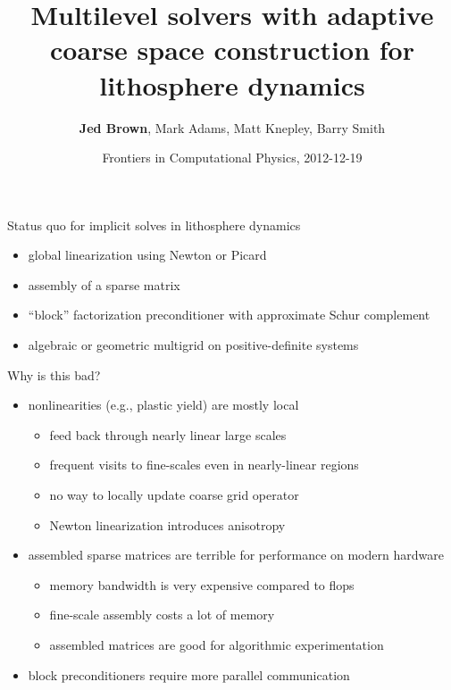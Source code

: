 \documentclass{beamer}
\title{Multilevel solvers with adaptive coarse space construction for lithosphere dynamics}
\author{{\bf Jed Brown}\inst{1}, Mark Adams\inst{2}, Matt Knepley\inst{3}, Barry Smith\inst{1}}
\institute
{
  \inst{1}{Mathematics and Computer Science Division, Argonne National Laboratory} \\
  \inst{2}{Columbia University} \\
  \inst{3}{University of Chicago} \\
}
\date{Frontiers in Computational Physics, 2012-12-19}
\begin{document}
\lstset{language=C}
\normalem

\begin{frame}
  \titlepage
\end{frame}


\begin{frame}{Status quo for implicit solves in lithosphere dynamics}
  \begin{itemize}
  \item global linearization using Newton or Picard
  \item assembly of a sparse matrix
  \item ``block'' factorization preconditioner with approximate Schur complement
  \item algebraic or geometric multigrid on positive-definite systems
  \end{itemize}
  \begin{block}{Why is this bad?}
    \vspace{-1em}
    \begin{itemize}
    \item nonlinearities (e.g., plastic yield) are mostly local
      \begin{itemize}
      \item feed back through nearly linear large scales
      \item frequent visits to fine-scales even in nearly-linear regions
      \item no way to locally update coarse grid operator
      \item Newton linearization introduces anisotropy
      \end{itemize}
    \item assembled sparse matrices are terrible for performance on modern hardware
      \begin{itemize}
      \item memory bandwidth is very expensive compared to flops
      \item fine-scale assembly costs a lot of memory
      \item assembled matrices are good for algorithmic experimentation
      \end{itemize}
    \item block preconditioners require more parallel communication
    \end{itemize}
  \end{block}
\end{frame}



\end{document}
